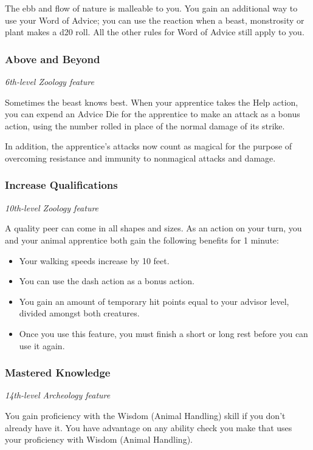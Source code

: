 \documentclass[letterpaper,openany,twoside,twocolumn]{book}
\begin{document}
	The ebb and flow of nature is malleable to you. You gain an additional way to use your Word of Advice; you can use the reaction when a beast, monstrosity or plant makes a d20 roll. All the other rules for Word of Advice still apply to you.
	
	\subsubsection*{Above and Beyond}
	\textnormal{\textit{6th-level Zoology feature}}
	
	Sometimes the beast knows best. When your apprentice takes the Help action, you can expend an Advice Die for the apprentice to make an attack as a bonus action, using the number rolled in place of the normal damage of its strike.
	
	In addition, the apprentice's attacks now count as magical for the purpose of overcoming resistance and immunity to nonmagical attacks and damage.
	
	\subsubsection*{Increase Qualifications}
	\textnormal{\textit{10th-level Zoology feature}}
	
	A quality peer can come in all shapes and sizes. As an action on your turn, you and your animal apprentice both gain the following benefits for 1 minute:
	
	\begin{itemize}
		\item Your walking speeds increase by 10 feet.
		\item You can use the dash action as a bonus action.
		\item You gain an amount of temporary hit points equal to your advisor level, divided amongst both creatures.
		\item Once you use this feature, you must finish a short or long rest before you can use it again.
	\end{itemize}
	
	\subsubsection*{Mastered Knowledge}
	\textnormal{\textit{14th-level Archeology feature}}
	
	You gain proficiency with the Wisdom (Animal Handling) skill if you don’t already have it. You have advantage on any ability check you make that uses your proficiency with Wisdom (Animal Handling).
	
\end{document}
